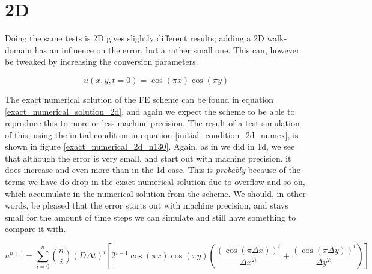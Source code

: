 \section{2D}
Doing the same tests is 2D gives slightly different results; adding a 2D walk-domain has an influence on the error, but a rather small one. 
This can, however be tweaked by increasing the conversion parameters.

\begin{equation}\label{initial_condition_2d_numex}
 u(x,y,t=0) = \cos(\pi x)\cos(\pi y)
\end{equation}

The exact numerical solution of the FE scheme can be found in equation \ref{exact_numerical_solution_2d}, and again we expect the scheme to be able to reproduce this to more or less machine precision. 
The result of a test simulation of this, using the initial condition in equation \ref{initial_condition_2d_numex}, is shown in figure \ref{exact_numerical_2d_n130}. 
Again, as in we did in 1d, we see that although the error is very small, and start out with machine precision, it does increase and even more than in the 1d case. 
This is \emph{probably} because of the terms we have do drop in the exact numerical solution due to overflow and so on, which accumulate in the numerical solution from the scheme. 
We should, in other words, be pleased that the error starts out with machine precision, and stays small for the amount of time steps we can simulate and still have something to compare it with.

\begin{equation}\label{exact_numerical_solution_2d}
 u^{n+1} = \sum\limits^n_{i=0}{n\choose i}\left(D\Delta t\right)^i\left[2^{i-1}\cos(\pi x)\cos(\pi y)\left(\frac{(\cos(\pi\Delta x))^i}{\Delta x^{2i}} +\frac{(\cos(\pi\Delta y))^i}{\Delta y^{2i}}\right)\right]
\end{equation}

